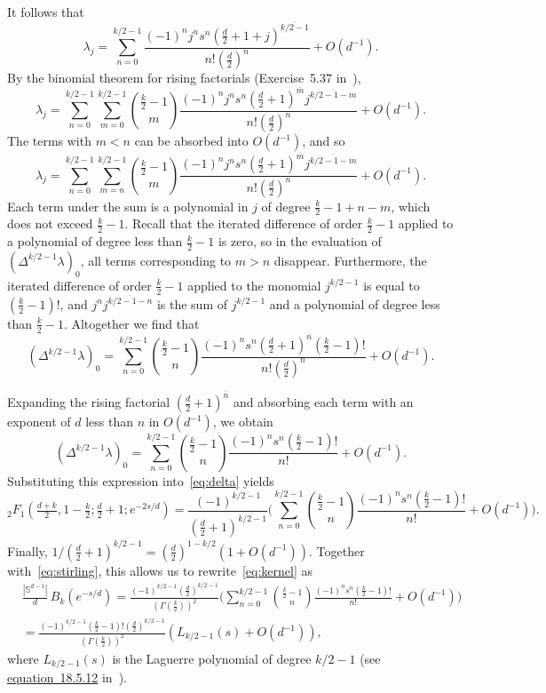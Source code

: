 \documentclass[a4paper,12pt,reqno]{amsart}
\numberwithin{equation}{section}
\theoremstyle{definition}
\newcommand{\sph}{\mathbb{S}}
\begin{document}
It follows that
\[
 \lambda_j = \sum_{n = 0}^{k / 2 - 1} \frac{(-1)^n j^n s^n (\tfrac{d}{2} + 1 + j)^{\overline{k / 2 - 1}}}{n! (\frac{d}{2})^n} + O(d^{-1}) .
\]
By the binomial theorem for rising factorials (Exercise~5.37 in~\cite{concrete-mathematics}),
\[
 \lambda_j = \sum_{n = 0}^{k / 2 - 1} \sum_{m = 0}^{k / 2 - 1} \binom{\frac{k}{2} - 1}{m} \frac{(-1)^n j^n s^n (\tfrac{d}{2} + 1)^{\overline{m}} j^{\overline{k / 2 - 1 - m}}}{n! (\frac{d}{2})^n} + O(d^{-1}) .
\]
The terms with $m < n$ can be absorbed into $O(d^{-1})$, and so
\[
 \lambda_j = \sum_{n = 0}^{k / 2 - 1} \sum_{m = n}^{k / 2 - 1} \binom{\frac{k}{2} - 1}{m} \frac{(-1)^n j^n s^n (\tfrac{d}{2} + 1)^{\overline{m}} j^{\overline{k / 2 - 1 - m}}}{n! (\frac{d}{2})^n} + O(d^{-1}) .
\]
Each term under the sum is a polynomial in $j$ of degree $\tfrac{k}{2} - 1 + n - m$, which does not exceed $\frac{k}{2} - 1$. Recall that the iterated difference of order $\frac{k}{2} - 1$ applied to a polynomial of degree less than $\frac{k}{2} - 1$ is zero, so in the evaluation of $(\Delta^{k / 2 - 1} \lambda)_0$, all terms corresponding to $m > n$ disappear. Furthermore, the iterated difference of order $\tfrac{k}{2} - 1$ applied to the monomial $j^{k/2 - 1}$ is equal to $(\frac{k}{2} - 1)!$, and $j^n j^{\overline{k/2 - 1 - n}}$ is the sum of $j^{k/2 - 1}$ and a polynomial of degree less than $\frac{k}{2} - 1$. Altogether we find that
\[
 (\Delta^{k / 2 - 1} \lambda)_0 = \sum_{n = 0}^{k / 2 - 1} \binom{\frac{k}{2} - 1}{n} \frac{(-1)^n s^n (\tfrac{d}{2} + 1)^{\overline{n}} (\frac{k}{2} - 1)!}{n! (\frac{d}{2})^n} + O(d^{-1}) .
\]

Expanding the rising factorial $(\tfrac{d}{2} + 1)^{\overline{n}}$ and absorbing each term with an exponent of $d$ less than $n$ in $O(d^{-1})$, we obtain
\[
( \Delta^{k / 2 - 1} \lambda)_0 = \sum_{n = 0}^{k / 2 - 1} \binom{\frac{k}{2} - 1}{n} \frac{(-1)^n s^n (\frac{k}{2} - 1)!}{n!} + O(d^{-1}) .
\]
Substituting this expression into~\eqref{eq:delta} yields
\[
 {_2F_1}(\tfrac{d + k}{2}, 1 - \tfrac{k}{2}; \tfrac{d}{2} + 1; e^{-2 s / d}) = \frac{(-1)^{k / 2 - 1}}{(\tfrac{d}{2} + 1)^{\overline{k / 2 - 1}}} \biggl( \sum_{n = 0}^{k / 2 - 1} \binom{\frac{k}{2} - 1}{n} \frac{(-1)^n s^n (\frac{k}{2} - 1)!}{n!} + O(d^{-1}) \biggr) .
\]
Finally, $1 / (\tfrac{d}{2} + 1)^{\overline{k / 2 - 1}} = (\tfrac{d}{2})^{1 - k / 2} (1 + O(d^{-1}))$. Together with~\eqref{eq:stirling}, this allows us to rewrite~\eqref{eq:kernel} as
\begin{align*}
 &\frac{|\sph^{d - 1}|}{d} \, B_k(e^{-s / d}) = \frac{(-1)^{k / 2 - 1} (\frac{d}{2})^{k/2 - 1}}{(\Gamma(\frac{k}{2}))^2} \biggl( \sum_{n = 0}^{k / 2 - 1} \binom{\frac{k}{2} - 1}{n} \frac{(-1)^n s^n (\frac{k}{2} - 1)!}{n!} + O(d^{-1}) \biggr)\\
 & = \frac{(-1)^{k / 2 - 1}(\frac{k}{2}-1)! (\frac{d}{2})^{k/2 - 1}}{(\Gamma(\frac{k}{2}))^2} (L_{k/2-1}(s)+O(d^{-1})),
\end{align*}
where $L_{k/2-1}(s)$  is the Laguerre polynomial of degree $k/2-1$ (see \href{https://dlmf.nist.gov/18.5.E12}{equation~18.5.12} in~\cite{dlmf}). 
\end{document}

